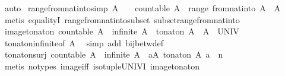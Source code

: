 \begin{isabellebody}
\ auto%
\endisatagproof
{\isafoldproof}%
%
\isadelimproof
\isanewline
%
\endisadelimproof
\isanewline
{}\isamarkupfalse%
\ range{\isacharunderscore}from{\isacharunderscore}nat{\isacharunderscore}into{\isacharbrackleft}simp{\isacharbrackright}{\isacharcolon}\ {\isachardoublequoteopen}A\ {\isasymnoteq}\ {\isacharbraceleft}{\isacharbraceright}\ {\isasymLongrightarrow}\ countable\ A\ {\isasymLongrightarrow}\ range\ {\isacharparenleft}from{\isacharunderscore}nat{\isacharunderscore}into\ A{\isacharparenright}\ {\isacharequal}\ A{\isachardoublequoteclose}\isanewline
%
\isadelimproof
\ \ %
\endisadelimproof
%
\isatagproof
{}\isamarkupfalse%
\ {\isacharparenleft}metis\ equalityI\ range{\isacharunderscore}from{\isacharunderscore}nat{\isacharunderscore}into{\isacharunderscore}subset\ subset{\isacharunderscore}range{\isacharunderscore}from{\isacharunderscore}nat{\isacharunderscore}into{\isacharparenright}%
\endisatagproof
{\isafoldproof}%
%
\isadelimproof
\isanewline
%
\endisadelimproof
\isanewline
{}\isamarkupfalse%
\ image{\isacharunderscore}to{\isacharunderscore}nat{\isacharunderscore}on{\isacharcolon}\ {\isachardoublequoteopen}countable\ A\ {\isasymLongrightarrow}\ infinite\ A\ {\isasymLongrightarrow}\ to{\isacharunderscore}nat{\isacharunderscore}on\ A\ {\isacharbackquote}\ A\ {\isacharequal}\ UNIV{\isachardoublequoteclose}\isanewline
%
\isadelimproof
\ \ %
\endisadelimproof
%
\isatagproof
{}\isamarkupfalse%
\ to{\isacharunderscore}nat{\isacharunderscore}on{\isacharunderscore}infinite{\isacharbrackleft}of\ A{\isacharbrackright}\ \isamarkupfalse%
\ {\isacharparenleft}simp\ add{\isacharcolon}\ bij{\isacharunderscore}betw{\isacharunderscore}def{\isacharparenright}%
\endisatagproof
{\isafoldproof}%
%
\isadelimproof
\isanewline
%
\endisadelimproof
\isanewline
{}\isamarkupfalse%
\ to{\isacharunderscore}nat{\isacharunderscore}on{\isacharunderscore}surj{\isacharcolon}\ {\isachardoublequoteopen}countable\ A\ {\isasymLongrightarrow}\ infinite\ A\ {\isasymLongrightarrow}\ {\isasymexists}a{\isasymin}A{\isachardot}\ to{\isacharunderscore}nat{\isacharunderscore}on\ A\ a\ {\isacharequal}\ n{\isachardoublequoteclose}\isanewline
%
\isadelimproof
\ \ %
\endisadelimproof
%
\isatagproof
{}\isamarkupfalse%
\ {\isacharparenleft}metis\ {\isacharparenleft}no{\isacharunderscore}types{\isacharparenright}\ image{\isacharunderscore}iff\ iso{\isacharunderscore}tuple{\isacharunderscore}UNIV{\isacharunderscore}I\ image{\isacharunderscore}to{\isacharunderscore}nat{\isacharunderscore}on{\isacharparenright}%

\end{isabellebody}

